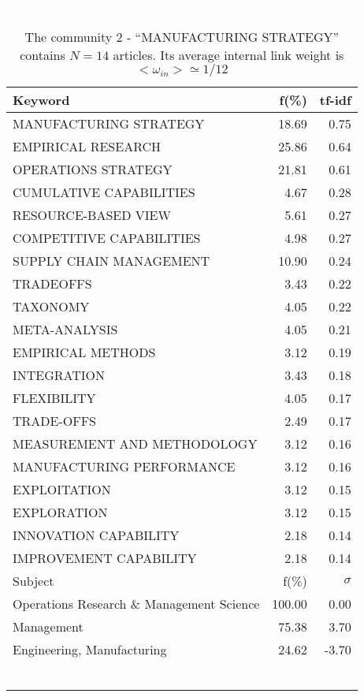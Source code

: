\documentclass[a4paper,11pt]{report}
\begin{document}
\begin{landscape}
\clearpage

\begin{table}[!ht]
\caption{The community 2 - ``MANUFACTURING STRATEGY'' contains $N = 14$ articles. Its average internal link weight is $<\omega_{in}> \simeq 1/12$ }
\textcolor{white}{aa}\\
{\scriptsize\begin{tabular}{|l r  r|}
\hline
Keyword & f(\%) & tf-idf \\
\hline
MANUFACTURING STRATEGY & 18.69 & 0.75\\
EMPIRICAL RESEARCH & 25.86 & 0.64\\
OPERATIONS STRATEGY & 21.81 & 0.61\\
CUMULATIVE CAPABILITIES & 4.67 & 0.28\\
RESOURCE-BASED VIEW & 5.61 & 0.27\\
COMPETITIVE CAPABILITIES & 4.98 & 0.27\\
SUPPLY CHAIN MANAGEMENT & 10.90 & 0.24\\
TRADEOFFS & 3.43 & 0.22\\
TAXONOMY & 4.05 & 0.22\\
META-ANALYSIS & 4.05 & 0.21\\
EMPIRICAL METHODS & 3.12 & 0.19\\
INTEGRATION & 3.43 & 0.18\\
FLEXIBILITY & 4.05 & 0.17\\
TRADE-OFFS & 2.49 & 0.17\\
MEASUREMENT AND METHODOLOGY & 3.12 & 0.16\\
MANUFACTURING PERFORMANCE & 3.12 & 0.16\\
EXPLOITATION & 3.12 & 0.15\\
EXPLORATION & 3.12 & 0.15\\
INNOVATION CAPABILITY & 2.18 & 0.14\\
IMPROVEMENT CAPABILITY & 2.18 & 0.14\\
\hline
\hline
Subject & f(\%) & $\sigma$\\
\hline
Operations Research \& Management Science & 100.00 & 0.00\\
Management & 75.38 & 3.70\\
Engineering, Manufacturing & 24.62 & -3.70\\
 &  & \\
 &  & \\
 &  & \\
 &  & \\
 &  & \\
 &  & \\

\end{tabular}}
\end{table}
\end{landscape}
\end{document}
